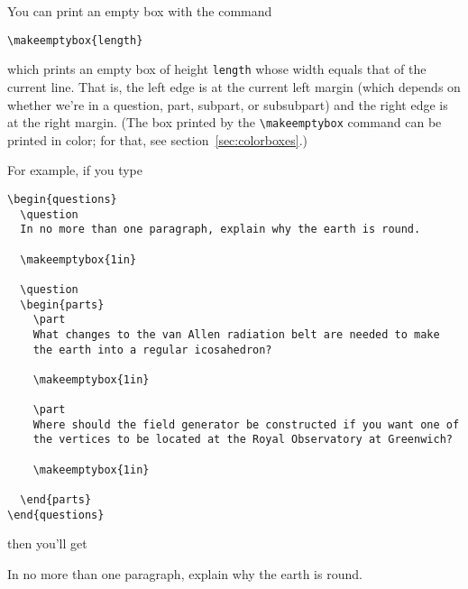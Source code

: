 \documentclass[12pt]{exam}
\begin{document}
You can print an empty box with the command
\begin{center}
  \verb"\makeemptybox{length}"
\end{center}
which prints an empty box of height \verb"length" whose width equals
that of the current line.  That is, the left edge is at the current
left margin (which depends on whether we're in a question, part,
subpart, or subsubpart) and the right edge is at the right margin.
(The box printed by the \verb"\makeemptybox" command can be printed in
color; for that, see section~\ref{sec:colorboxes}.)


\medskip

For example, if you type
\begin{verbatim}
\begin{questions}
  \question 
  In no more than one paragraph, explain why the earth is round.

  \makeemptybox{1in}
  
  \question
  \begin{parts}
    \part
    What changes to the van Allen radiation belt are needed to make
    the earth into a regular icosahedron?

    \makeemptybox{1in}

    \part
    Where should the field generator be constructed if you want one of
    the vertices to be located at the Royal Observatory at Greenwich?

    \makeemptybox{1in}

  \end{parts}
\end{questions}
\end{verbatim}
then you'll get
\begin{questions}
  \question 
  In no more than one paragraph, explain why the earth is round.

  \makeemptybox{1in}
  
  \question
\end{questions}
\end{document}
